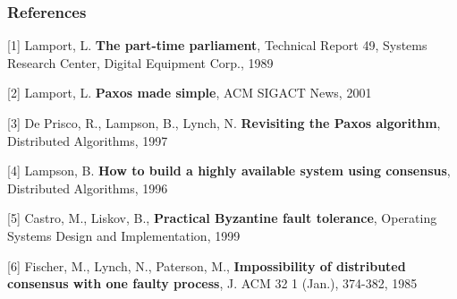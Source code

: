 \documentclass[10 pt]{beamer}
\begin{document}
\begin{frame}
  \frametitle{References}

[1] Lamport, L. \textbf{The part-time parliament}, Technical Report 49, Systems Research Center, Digital Equipment Corp., 1989

\vspace{4 mm}
[2] Lamport, L. \textbf{Paxos made simple}, ACM SIGACT News, 2001

\vspace{4 mm}
[3] De Prisco, R., Lampson, B., Lynch, N. \textbf{Revisiting the Paxos algorithm}, Distributed Algorithms, 1997

\vspace{4 mm}
[4] Lampson, B. \textbf{How to build a highly available system using consensus}, Distributed Algorithms, 1996

\vspace{4 mm}
[5] Castro, M., Liskov, B., \textbf{Practical Byzantine fault tolerance}, Operating Systems Design and Implementation, 1999

\vspace{4 mm}
[6] Fischer, M., Lynch, N., Paterson, M., \textbf{Impossibility of distributed consensus with one faulty process}, J. ACM 32 1 (Jan.), 374-382, 1985
  
\end{frame}
\end{document}
